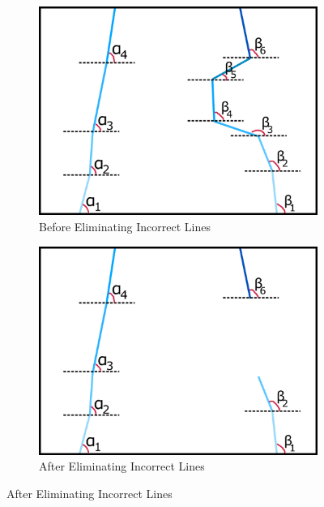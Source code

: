 \documentclass[a4paper,12pt]{article}
\begin{document}
\begin{enumerate}[A.]
\begin{figure}[t!]
\begin{subfigure}{.46\textwidth}
\includegraphics[width=0.44\unitlength]{images/dataP_explained1}

\caption{\label{fig:dataP_explained1} Before Eliminating Incorrect Lines}

\end{subfigure}%
\begin{subfigure}{.46\textwidth}

\centering

\includegraphics[width=0.44\unitlength]{images/dataP_explained2}

\caption{\label{fig:dataP_explained2} After Eliminating Incorrect Lines}

\end{subfigure}


\end{figure}
\end{enumerate}
\end{document}
